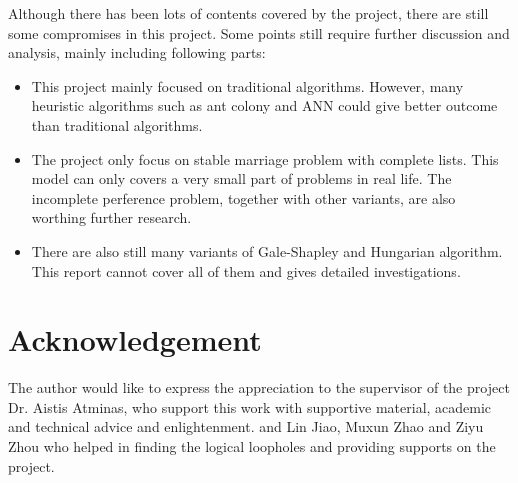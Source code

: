 \documentclass[14pt]{extarticle}
\begin{document}
Although there has been lots of contents covered by the project, there are still some compromises in this project. Some points still require further discussion and analysis, mainly including following parts:
\begin{itemize}
  \item This project mainly focused on traditional algorithms. However, many heuristic algorithms such as ant colony and ANN could give better outcome than traditional algorithms.
  \item The project only focus on stable marriage problem with complete lists. This model can only covers a very small part of problems in real life. The incomplete perference problem, together with other variants, are also worthing further research.
  \item There are also still many variants of Gale-Shapley and Hungarian algorithm. This report cannot cover all of them and gives detailed investigations.
\end{itemize}

\section*{Acknowledgement}

The author would like to express the appreciation to the supervisor of the project Dr. Aistis Atminas, who support this work with supportive material, academic and technical advice and enlightenment.
and Lin Jiao, Muxun Zhao and Ziyu Zhou who helped in finding the logical loopholes and providing supports on the project.

\newpage
\end{document}
